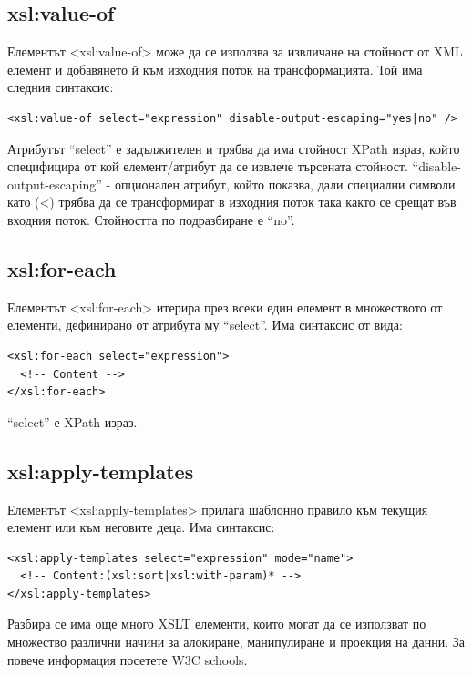 \documentclass[11pt]{article} %
\begin{document}
\subsection{xsl:value-of}
Елементът <xsl:value-of> може да се използва за извличане на стойност от XML елемент и добавянето й към изходния поток на трансформацията. Той има следния синтаксис:
\begin{verbatim}
<xsl:value-of select="expression" disable-output-escaping="yes|no" />
\end{verbatim}
Атрибутът \enquote{select} е задължителен и трябва да има стойност XPath израз, който специфицира от кой елемент/атрибут да се извлече търсената стойност. \enquote{disable-output-escaping} - опционален атрибут, който показва, дали специални символи като (<) трябва да се трансформират в изходния поток така както се срещат във входния поток. Стойността по подразбиране е \enquote{no}.

\subsection{xsl:for-each}
Елементът <xsl:for-each> итерира през всеки един елемент в множеството от елементи, дефинирано от атрибута му \enquote{select}. Има синтаксис от вида:
\begin{verbatim}
<xsl:for-each select="expression">
  <!-- Content -->
</xsl:for-each>
\end{verbatim}
\enquote{select} е XPath израз.

\subsection{xsl:apply-templates}
Елементът <xsl:apply-templates> прилага шаблонно правило към текущия елемент или към неговите деца. Има синтаксис:
\begin{verbatim}
<xsl:apply-templates select="expression" mode="name">
  <!-- Content:(xsl:sort|xsl:with-param)* -->
</xsl:apply-templates>
\end{verbatim}

Разбира се има още много XSLT елементи, които могат да се използват по множество различни начини за алокиране, манипулиране и проекция на данни. За повече информация посетете W3C schools.
\end{document}
